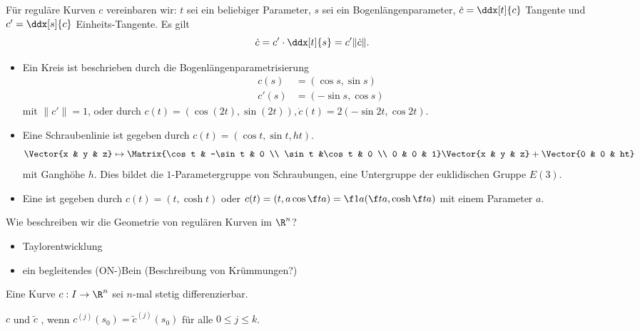 \begin{conv}
	Für reguläre Kurven $c$ vereinbaren wir:
	$t$ sei ein beliebiger Parameter, $s$ sei ein Bogenlängenparameter, $\dot c = \ddx[t]{c}$ Tangente und $c' = \ddx[s]{c}$ Einheits-Tangente.
	Es gilt
	\[
		\dot c = c' \cdot \ddx[t]{s} = c' \|\dot c\|.
	\]
\end{conv}

\begin{ex}
	\begin{itemize}
		\item
			Ein Kreis ist beschrieben durch die Bogenlängenparametrisierung
			\begin{align*}
				c(s) &= (\cos s, \sin s) \\
				c'(s) &= (-\sin s, \cos s)
			\end{align*}
			mit $\|c'\| = 1$, oder durch $c(t) = (\cos (2t), \sin(2t)), \dot c(t) = 2(-\sin 2t, \cos 2t)$.
		\item
			Eine Schraubenlinie ist gegeben durch $c(t) = (\cos t, \sin t, ht)$.
			\[
				\Vector{x & y & z}
				\mapsto
				\Matrix{\cos t & -\sin t & 0 \\ \sin t &\cos t & 0 \\ 0 & 0 & 1}
				\Vector{x & y & z}
				+ \Vector{0 & 0 & ht}
			\]
			mit Ganghöhe $h$.
			Dies bildet die $1$-Parametergruppe von Schraubungen, eine Untergruppe der euklidischen Gruppe $E(3)$.
		\item
			Eine  ist gegeben durch $c(t) = (t, \cosh t)$ oder $c(t) = (t, a \cos \f ta) = \f 1a (\f ta, \cosh \f ta)$ mit einem Parameter $a$.
	\end{itemize}
\end{ex}

Wie beschreiben wir die Geometrie von regulären Kurven im $\R^n$?
\begin{itemize}
	\item
		Taylorentwicklung
	\item
		ein begleitendes (ON-)Bein (Beschreibung von Krümmungen?)
\end{itemize}

Eine Kurve $c: I \to \R^n$ sei $n$-mal stetig differenzierbar.

\begin{df}
	$c$ und $\tilde c$ , wenn $c^{(j)}(s_0) = \tilde c^{(j)}(s_0)$ für alle $0 \le j \le k$.
\end{df}


